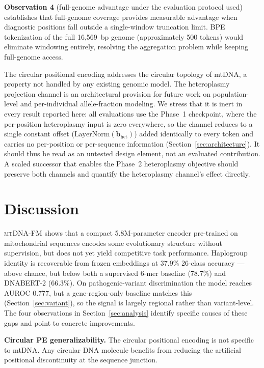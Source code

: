 \documentclass[10pt]{article}
\newcommand{\mtdnafm}{\textsc{mtDNA-FM}\xspace}
\begin{document}
\textbf{Observation 4} (full-genome advantage under the evaluation protocol used) establishes
that full-genome coverage provides measurable advantage when diagnostic positions fall outside a
single-window truncation limit. BPE tokenization of the full 16,569~bp genome (approximately 500
tokens) would eliminate windowing entirely, resolving the aggregation problem while keeping
full-genome access.

The circular positional encoding addresses the circular topology of mtDNA, a property not handled
by any existing genomic model. The heteroplasmy projection channel is an architectural provision
for future work on population-level and per-individual allele-fraction modeling. We stress that it
is inert in every result reported here: all evaluations use the Phase~1 checkpoint, where the
per-position heteroplasmy input is zero everywhere, so the channel reduces to a single constant
offset ($\text{LayerNorm}(\mathbf{b}_\text{het})$) added identically to every token and carries no
per-position or per-sequence information (Section~\ref{sec:architecture}). It should thus be read
as an untested design element, not an evaluated contribution. A scaled successor that enables the
Phase~2 heteroplasmy objective should preserve both channels and quantify the heteroplasmy
channel's effect directly.

\section{Discussion}

\mtdnafm{} shows that a compact 5.8M-parameter encoder pre-trained on mitochondrial sequences
encodes some evolutionary structure without supervision, but does not yet yield competitive
task performance. Haplogroup identity is recoverable from frozen embeddings at 37.9\% 26-class
accuracy --- above chance, but below both a supervised 6-mer baseline (78.7\%) and DNABERT-2
(66.3\%). On pathogenic-variant discrimination the model reaches AUROC 0.777, but a gene-region-only
baseline matches this (Section~\ref{sec:variant}), so the signal is largely regional rather than
variant-level. The four observations in Section~\ref{sec:analysis} identify specific causes of
these gaps and point to concrete improvements.

\textbf{Circular PE generalizability.} The circular positional encoding is not specific to
mtDNA. Any circular DNA molecule benefits from reducing the artificial positional discontinuity
at the sequence junction.
\end{document}
